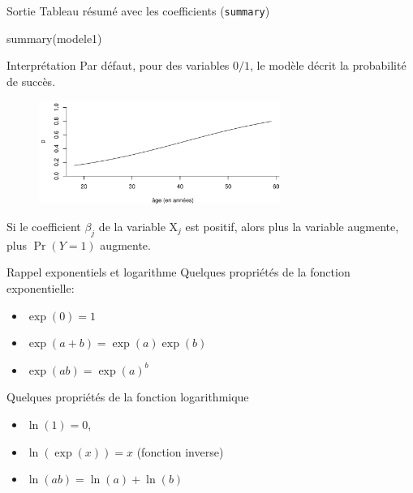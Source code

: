 \documentclass[
  ignorenonframetext,
]{beamer}
\newenvironment{Shaded}{\begin{snugshade}}{\end{snugshade}}
\newcommand{\FunctionTok}[1]{\textcolor[rgb]{0.28,0.35,0.67}{#1}}
\newcommand{\NormalTok}[1]{\textcolor[rgb]{0.00,0.23,0.31}{#1}}
\providecommand{\tightlist}{%
  \setlength{\itemsep}{0pt}\setlength{\parskip}{0pt}}\usepackage{longtable,booktabs,array}
\begin{document}
\begin{frame}[fragile]{Sortie}
\protect\hypertarget{sortie}{}
Tableau résumé avec les coefficients (\texttt{summary})

\begin{Shaded}
\begin{Highlighting}[numbers=left,,]
\FunctionTok{summary}\NormalTok{(modele1)}
\end{Highlighting}
\end{Shaded}
\end{frame}

\begin{frame}{Interprétation}
\protect\hypertarget{interpruxe9tation}{}
Par défaut, pour des variables \(0/1\), le modèle décrit la probabilité
de succès.

\begin{figure}

{\centering \includegraphics[width=0.7\textwidth,height=\textheight]{MATH60602-diapos5_files/figure-beamer/logitplot2-1.pdf}

}

\end{figure}

Si le coefficient \(\beta_j\) de la variable \(\mathrm{X}_j\) est
positif, alors plus la variable augmente, plus \(\Pr(Y=1)\) augmente.
\end{frame}

\begin{frame}{Rappel exponentiels et logarithme}
\protect\hypertarget{rappel-exponentiels-et-logarithme}{}
Quelques propriétés de la fonction exponentielle:

\begin{itemize}
\tightlist
\item
  \(\exp(0) = 1\)
\item
  \(\exp(a + b) = \exp(a)\exp(b)\)
\item
  \(\exp(ab)= \exp(a)^b\)
\end{itemize}

Quelques propriétés de la fonction logarithmique

\begin{itemize}
\tightlist
\item
  \(\ln(1)=0\),
\item
  \(\ln(\exp(x))=x\) (fonction inverse)
\item
  \(\ln(ab) = \ln(a) + \ln(b)\)
\end{itemize}
\end{frame}
\end{document}
